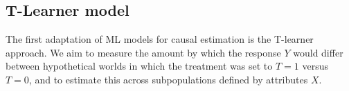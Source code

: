 \documentclass[12pt, a4paper]{article}
\begin{document}
%



\subsection{T-Learner model}

The first adaptation of ML models for causal estimation is the T-learner approach. We aim to measure the amount by which the
response $Y$ would differ between hypothetical worlds in which the treatment
was set to $T=1$ versus $T=0$, and to estimate this across subpopulations
defined by attributes $X$. 
\end{document}
